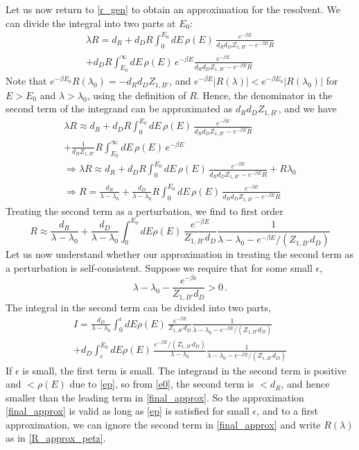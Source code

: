 \documentclass[a4paper,11pt]{article}
\newcommand{\be}{\begin{equation}}
\newcommand{\ee}{\end{equation}}
\begin{document}
\begin{enumerate}
\begin{appendix}
Let us now return to \eqref{r_gen} to obtain an approximation for the resolvent. We can divide the integral into two parts at $E_0$: 
\be
\begin{gathered} 
\lambda R = d_R + d_D R \int_0^{E_0} dE\, \rho(E)\, \frac{e^{-\beta E} }{d_R d_D Z_{1, B'} - e^{-\beta E} R} \\+ d_D R \int_{E_0}^{\infty} dE\, \rho(E)\,e^{-\beta E} \frac{e^{-\beta E} }{d_R d_D Z_{1, B'} - e^{-\beta E} R}
\end{gathered} 
\ee
Note that $e^{-\beta E_0}R(\lambda_0) = - d_R d_D Z_{1, B'}$, and $e^{-\beta E}|R(\lambda)|< e^{-\beta E_0}|R(\lambda_0)|$ for $E> E_0$ and $\lambda> \lambda_0$, using the definition of $R$. Hence, the denominator in the second term of the integrand can be approximated as $d_R d_D Z_{1, B'}$, and we have
\be \begin{gathered}
\lambda R \approx d_R + d_D R \int_0^{E_0} dE\, \rho(E)\, \frac{e^{-\beta E} }{d_R d_D Z_{1, B'} - e^{-\beta E} R} \\+ \frac{1}{d_R Z_{1, B'}}R \int_{E_0}^{\infty} dE\, \rho(E)\,e^{-\beta E} \\
\Rightarrow \lambda R \approx d_R + d_D R \int_0^{E_0} dE\, \rho(E)\, \frac{e^{-\beta E} }{d_R d_D Z_{1, B'} - e^{-\beta E} R} + R \lambda_0 \\
\Rightarrow R = \frac{d_R}{\lambda - \lambda_0} + \frac{d_D}{\lambda- \lambda_0} R \int_0^{E_0} dE\, \rho(E)\, \frac{e^{-\beta E} }{d_R d_D Z_{1, B'} - e^{-\beta E} R} 
\end{gathered} 
\ee
Treating the second term as a perturbation, we find to first order 
\be 
R \approx \frac{d_R}{\lambda - \lambda_0} + \frac{d_D}{\lambda-\lambda_0} \int_0^{E_0} dE \rho(E)\, \frac{e^{-\beta E}}{Z_{1,B'} d_D} \frac{1}{\lambda -\lambda_0 - e^{-\beta E}/(Z_{1, B'} d_D)} \label{final_approx}
\ee
Let us now understand whether our approximation in treating the second term as a perturbation is self-consistent. Suppose we require that for some small $\epsilon$, 
\be 
\lambda - \lambda_0 - \frac{e^{-\beta \epsilon}}{Z_{1, B'} d_D}>0 \, . \label{ep}
\ee
The integral in the second term can be divided into two parts, 
\be 
\begin{gathered} 
I = \frac{d_D}{\lambda-\lambda_0} \int_0^{\epsilon} dE \rho(E)\, \frac{e^{-\beta E}}{Z_{1,B'} d_D} \frac{1}{\lambda -\lambda_0 - e^{-\beta E}/(Z_{1, B'} d_D)} \\ + d_D \int_{\epsilon}^{E_0} dE \rho(E)\, \frac{e^{-\beta E}/{(Z_{1,B'} d_D)}}{\lambda- \lambda_0} \frac{1}{\lambda -\lambda_0 - e^{-\beta E}/(Z_{1, B'} d_D)} 
\end{gathered} 
\label{corr}
\ee
If $\epsilon$ is small, the first term is small. The integrand in the second term is positive and $<\rho(E)$ due to \eqref{ep}, so from \eqref{e0}, the second term is $<d_R$, and hence smaller than the leading term in \eqref{final_approx}. So the approximation \eqref{final_approx} is valid as long as \eqref{ep} is satisfied for small $\epsilon$, and to a first approximation, we can ignore the second term in \eqref{final_approx} and write $R(\lambda)$ as in \eqref{R_approx_petz}. 



\end{appendix}
\end{enumerate}
\end{document}
